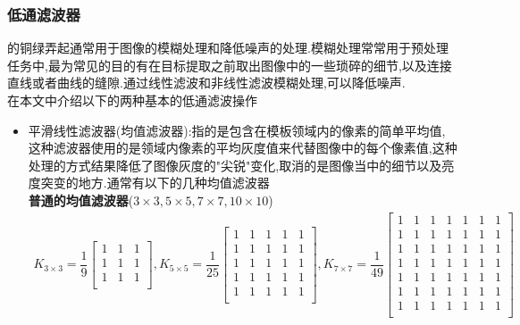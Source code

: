 \documentclass[UTF8,a4paper,10pt]{ctexart}
\begin{document}
\begin{flushleft}
        \subsubsection{低通滤波器}
        \hspace{2em}的铜绿弄起通常用于图像的模糊处理和降低噪声的处理.模糊处理常常用于预处理任务中,最为常见的目的有在目标提取之前取出图像中的一些琐碎的细节,以及连接直线或者曲线的缝隙.通过线性滤波和非线性滤波模糊处理,可以降低噪声.\\
        \hspace{2em}在本文中介绍以下的两种基本的低通滤波操作
        \begin{itemize}
            \item 平滑线性滤波器(均值滤波器):指的是包含在模板领域内的像素的简单平均值,这种滤波器使用的是领域内像素的平均灰度值来代替图像中的每个像素值,这种处理的方式结果降低了图像灰度的"尖锐"变化,取消的是图像当中的细节以及亮度突变的地方.通常有以下的几种均值滤波器\\
            \hspace{2em}\textbf{普通的均值滤波器}($3\times{3},5\times{5},7\times{7},10\times{10}$)
            \begin{eqnarray}
                K_{3\times{3}}=\dfrac{1}{9}\left[\begin{array}{ccc}
                    1 & 1 & 1\\
                    1 & 1 & 1\\
                    1 & 1 & 1\\
                \end{array}\right],K_{5\times{5}}=\dfrac{1}{25}\left[\begin{array}{ccccc}
                    1 & 1 & 1 & 1 & 1\\
                    1 & 1 & 1 & 1 & 1\\
                    1 & 1 & 1 & 1 & 1\\
                    1 & 1 & 1 & 1 & 1\\
                    1 & 1 & 1 & 1 & 1\\
                \end{array}\right],K_{7\times{7}}=\dfrac{1}{49}\left[\begin{array}{ccccccc}
                    1 & 1 & 1 & 1 & 1 & 1 & 1\\
                    1 & 1 & 1 & 1 & 1 & 1 & 1\\
                    1 & 1 & 1 & 1 & 1 & 1 & 1\\
                    1 & 1 & 1 & 1 & 1 & 1 & 1\\
                    1 & 1 & 1 & 1 & 1 & 1 & 1\\
                    1 & 1 & 1 & 1 & 1 & 1 & 1\\
                    1 & 1 & 1 & 1 & 1 & 1 & 1\\
                \end{array}\right]\nonumber
            \end{eqnarray}


\end{itemize}
\end{flushleft}
\end{document}

